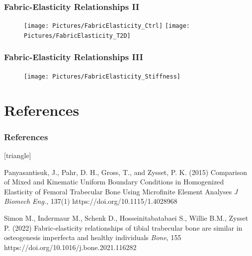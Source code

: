 \documentclass[xcolor=table,11pt]{beamer}
\begin{document}
	\begin{frame}
		\frametitle{Fabric-Elasticity Relationships II}
		\begin{figure}
			\centering
			\texttt{[image: Pictures/FabricElasticity\_Ctrl]}
			\hfill
			\texttt{[image: Pictures/FabricElasticity\_T2D]}
		\end{figure}
	\end{frame}

	\begin{frame}
		\frametitle{Fabric-Elasticity Relationships III}
		\begin{figure}
			\centering
			\texttt{[image: Pictures/FabricElasticity\_Stiffness]}
		\end{figure}
	\end{frame}
		

	\section{References}

	\begin{frame}
		\frametitle{References}
		\footnotesize{
				\begin{thebibliography}{99}
						\setbeamertemplate{bibliography item}[triangle]
						
						 Panyasantisuk, J., Pahr, D. H., Gross, T., and Zysset, P. K. (2015)
						\newblock Comparison of Mixed and Kinematic Uniform Boundary Conditions in Homogenized Elasticity of Femoral Trabecular Bone Using Microfinite Element Analyses
						\newblock \textit{J Biomech Eng.}, 137(1)
						\newblock https://doi.org/10.1115/1.4028968

						Simon M., Indermaur M., Schenk D., Hosseinitabatabaei S., Willie B.M., Zysset P. (2022)
						\newblock Fabric-elasticity relationships of tibial trabecular bone are similar in osteogenesis imperfecta and healthy individuals
						\newblock \textit{Bone}, 155
						\newblock https://doi.org/10.1016/j.bone.2021.116282
						
					\end{thebibliography}
			}
	\end{frame}
	
\end{document}
